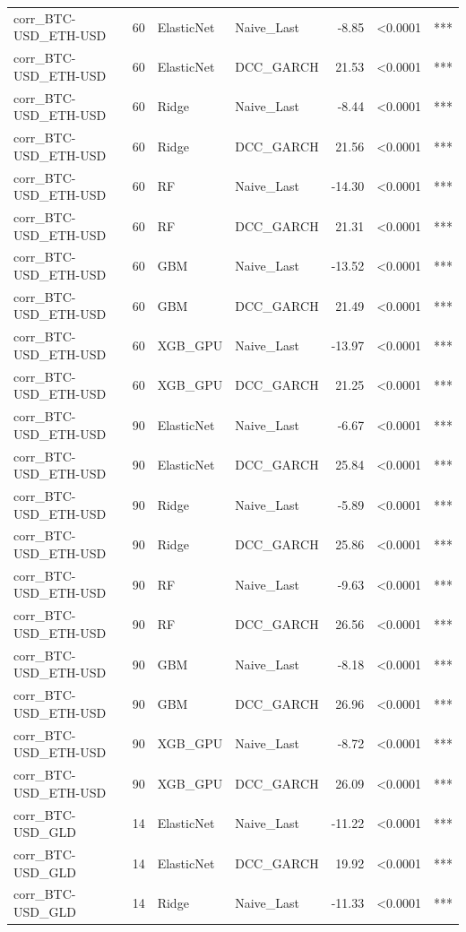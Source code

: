 \begin{table}[H]
\begin{tabular}{llllrrl}
corr_BTC-USD_ETH-USD & 60 & ElasticNet & Naive_Last & -8.85 & <0.0001 & *** \\
corr_BTC-USD_ETH-USD & 60 & ElasticNet & DCC_GARCH & 21.53 & <0.0001 & *** \\
corr_BTC-USD_ETH-USD & 60 & Ridge & Naive_Last & -8.44 & <0.0001 & *** \\
corr_BTC-USD_ETH-USD & 60 & Ridge & DCC_GARCH & 21.56 & <0.0001 & *** \\
corr_BTC-USD_ETH-USD & 60 & RF & Naive_Last & -14.30 & <0.0001 & *** \\
corr_BTC-USD_ETH-USD & 60 & RF & DCC_GARCH & 21.31 & <0.0001 & *** \\
corr_BTC-USD_ETH-USD & 60 & GBM & Naive_Last & -13.52 & <0.0001 & *** \\
corr_BTC-USD_ETH-USD & 60 & GBM & DCC_GARCH & 21.49 & <0.0001 & *** \\
corr_BTC-USD_ETH-USD & 60 & XGB_GPU & Naive_Last & -13.97 & <0.0001 & *** \\
corr_BTC-USD_ETH-USD & 60 & XGB_GPU & DCC_GARCH & 21.25 & <0.0001 & *** \\
corr_BTC-USD_ETH-USD & 90 & ElasticNet & Naive_Last & -6.67 & <0.0001 & *** \\
corr_BTC-USD_ETH-USD & 90 & ElasticNet & DCC_GARCH & 25.84 & <0.0001 & *** \\
corr_BTC-USD_ETH-USD & 90 & Ridge & Naive_Last & -5.89 & <0.0001 & *** \\
corr_BTC-USD_ETH-USD & 90 & Ridge & DCC_GARCH & 25.86 & <0.0001 & *** \\
corr_BTC-USD_ETH-USD & 90 & RF & Naive_Last & -9.63 & <0.0001 & *** \\
corr_BTC-USD_ETH-USD & 90 & RF & DCC_GARCH & 26.56 & <0.0001 & *** \\
corr_BTC-USD_ETH-USD & 90 & GBM & Naive_Last & -8.18 & <0.0001 & *** \\
corr_BTC-USD_ETH-USD & 90 & GBM & DCC_GARCH & 26.96 & <0.0001 & *** \\
corr_BTC-USD_ETH-USD & 90 & XGB_GPU & Naive_Last & -8.72 & <0.0001 & *** \\
corr_BTC-USD_ETH-USD & 90 & XGB_GPU & DCC_GARCH & 26.09 & <0.0001 & *** \\
corr_BTC-USD_GLD & 14 & ElasticNet & Naive_Last & -11.22 & <0.0001 & *** \\
corr_BTC-USD_GLD & 14 & ElasticNet & DCC_GARCH & 19.92 & <0.0001 & *** \\
corr_BTC-USD_GLD & 14 & Ridge & Naive_Last & -11.33 & <0.0001 & *** \\

\end{tabular}
\end{table}
